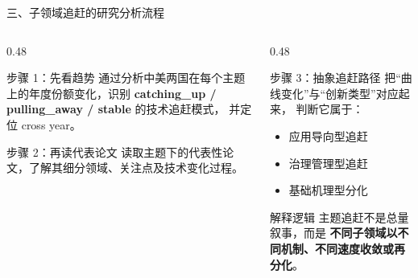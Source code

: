 \documentclass{beamer}
\newcommand{\hi}[1]{\textcolor{njupurple}{\textbf{#1}}}
\begin{document}
\begin{frame}{三、子领域追赶的研究分析流程}
    \begin{columns}[T]
        \begin{column}{0.48\linewidth}
            \begin{block}{步骤 1：先看趋势}
                \small
                通过分析中美两国在每个主题上的年度份额变化，识别
                \hi{catching\_up / pulling\_away / stable} 的技术追赶模式，
                并定位 cross year。
            \end{block}
            \begin{block}{步骤 2：再读代表论文}
                \small
                读取主题下的代表性论文，了解其细分领域、关注点及技术变化过程。
            \end{block}
        \end{column}
        \begin{column}{0.48\linewidth}
            \begin{block}{步骤 3：抽象追赶路径}
                \small
                把“曲线变化”与“创新类型”对应起来，
                判断它属于：
                \begin{itemize}
                    \item 应用导向型追赶
                    \item 治理管理型追赶
                    \item 基础机理型分化
                \end{itemize}
            \end{block}
            \begin{block}{解释逻辑}
                \small
                主题追赶不是总量叙事，而是
                \hi{不同子领域以不同机制、不同速度收敛或再分化}。
            \end{block}
        \end{column}
    \end{columns}
\end{frame}
\end{document}
